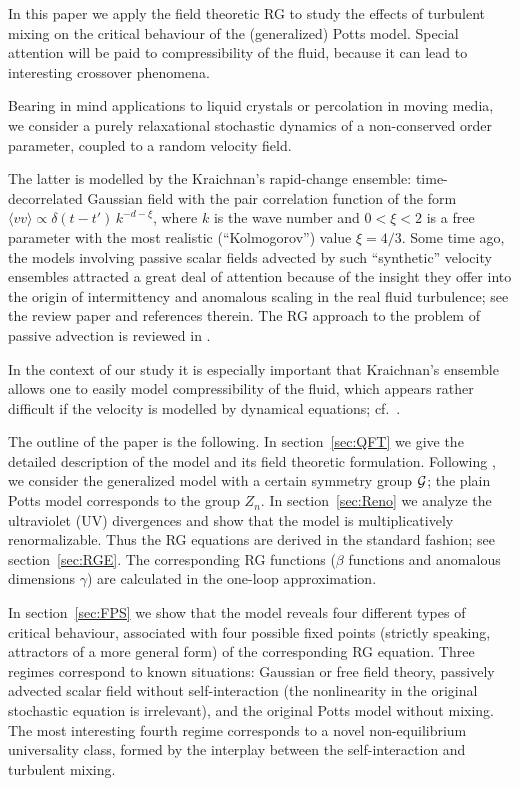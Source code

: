 \documentclass[12pt]{iopart}
\begin{document}
In this paper we apply the field theoretic RG to study the effects of
turbulent mixing on the critical behaviour of the (generalized) Potts model.
Special attention will be paid to compressibility of the fluid, because it
can lead to interesting crossover phenomena.

Bearing in mind applications to liquid crystals or percolation in moving
media, we consider a purely relaxational stochastic dynamics of a
non-conserved order parameter, coupled to a random velocity field.

The latter is modelled by the Kraichnan's rapid-change ensemble:
time-decorrelated Gaussian field with the pair correlation function of the
form $\langle vv\rangle \propto \delta(t-t') \, k^{-d-\xi}$, where $k$ is
the wave number and $0<\xi<2$ is a free parameter with the most realistic
(``Kolmogorov'') value $\xi=4/3$. Some time ago, the models involving passive
scalar fields advected by such ``synthetic'' velocity ensembles attracted a
great deal of attention because of the insight they offer into the origin of
intermittency and anomalous scaling in the real fluid turbulence; see the
review paper \cite{FGV} and references therein. The RG approach to the
problem of passive advection is reviewed in \cite{JphysA}.


In the context of our study it is especially important that Kraichnan's
ensemble allows one to easily model compressibility of the fluid, which
appears rather difficult if the velocity is modelled by dynamical
equations; cf.~\cite{AK}.

The outline of the paper is the following. In section~\ref{sec:QFT} we give
the detailed description of the model and its field theoretic formulation.
Following \cite{Bonfim}, we consider the generalized model with a certain
symmetry group ${\cal G}$; the plain Potts model corresponds to the group
$Z_{n}$. In section~\ref{sec:Reno} we analyze the ultraviolet (UV)
divergences and show that the model is multiplicatively renormalizable.
Thus the RG equations are derived in the standard fashion; see
section~\ref{sec:RGE}. The corresponding RG functions ($\beta$ functions
and anomalous dimensions $\gamma$) are calculated in the one-loop
approximation.

In section~\ref{sec:FPS} we show that the model reveals four different
types of critical behaviour, associated with four possible fixed points
(strictly speaking, attractors of a more general form) of the corresponding
RG equation. Three regimes correspond to known situations: Gaussian or free
field theory, passively advected scalar field without self-interaction
(the nonlinearity in the original stochastic equation is irrelevant), and
the original Potts model without mixing. The most interesting fourth regime
corresponds to a novel non-equilibrium universality class, formed by the
interplay between the self-interaction and turbulent mixing.
\end{document}
